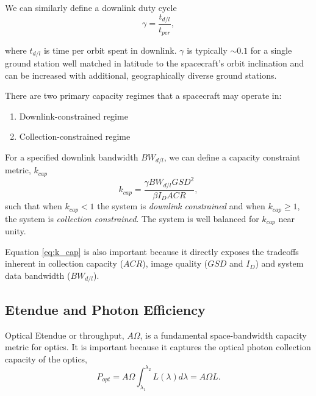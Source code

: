 \documentclass[]{spieman}  %
\begin{document}
We can similarly define a downlink duty cycle
\begin{equation}
    \gamma = \frac{t_{d/l}}{t_{per}},
\end{equation}

where $t_{d/l}$ is time per orbit spent in downlink.  $\gamma$ is typically $\sim 0.1$ for a single ground station well matched in latitude to the spacecraft's orbit inclination and can be increased with additional, geographically diverse ground stations.

There are two primary capacity regimes that a spacecraft may operate in:

\begin{enumerate}
\item Downlink-constrained regime
\item Collection-constrained regime
\end{enumerate}

For a specified downlink bandwidth $BW_{d/l}$, we can define a capacity constraint metric, $k_{cap}$
\begin{equation}
\label{eq:k_cap}
k_{cap} = \frac{\gamma BW_{d/l} GSD^2}{\beta I_D ACR},
\end{equation}
such that when $k_{cap} < 1$ the system is \emph{downlink constrained} and when $k_{cap} \geq 1$, the system is \emph{collection constrained}.  The system is well balanced for $k_{cap}$ near unity.  

Equation \eqref{eq:k_cap} is also  important because it directly exposes the tradeoffs inherent in collection capacity ($ACR$), image quality ($GSD$ and $I_D$) and system data bandwidth ($BW_{d/l}$).



\subsection{Etendue and Photon Efficiency}
\label{sec:entendue}

Optical Etendue or throughput, $A \Omega$, is a fundamental space-bandwidth capacity metric for optics.  It is important because it captures the optical photon collection capacity of the optics,
\begin{equation}
    P_{opt} = A\Omega \int_{\lambda_1}^{\lambda_2}L(\lambda) d\lambda = A\Omega L.
\end{equation}
\end{document}
